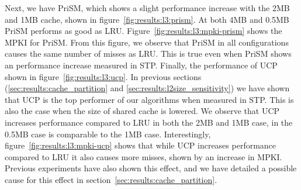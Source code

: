 Next, we have PriSM, which shows a slight performance increase with the 2MB and 1MB cache, shown in figure~\ref{fig:results:l3:prism}. 
At both 4MB and 0.5MB PriSM performs as good as LRU.
Figure~\ref{fig:results:l3:mpki-prism} shows the MPKI for PriSM.
From this figure, we observe that PriSM in all configurations causes the same number of misses as LRU.
This is true even when PriSM shows an performance increase measured in STP.
Finally, the performance of UCP shown in figure~\ref{fig:results:l3:ucp}. 
In previous sections (\ref{sec:results:cache_partition} and \ref{sec:results:l2size_sensitivity}) we have shown that UCP is the top performer of our algorithms when measured in STP.
This is also the case when the size of shared cache is lowered.
We observe that UCP increases performance compared to LRU in both the 2MB and 1MB case, in the 0.5MB case is comparable to the 1MB case.
Interestingly, figure~\ref{fig:results:l3:mpki-ucp} shows that while UCP increases performance compared to LRU it also causes more misses, shown by an increase in MPKI.
Previous experiments have also shown this effect, and we have detailed a possible cause for this effect in section~\ref{sec:results:cache_partition}.
